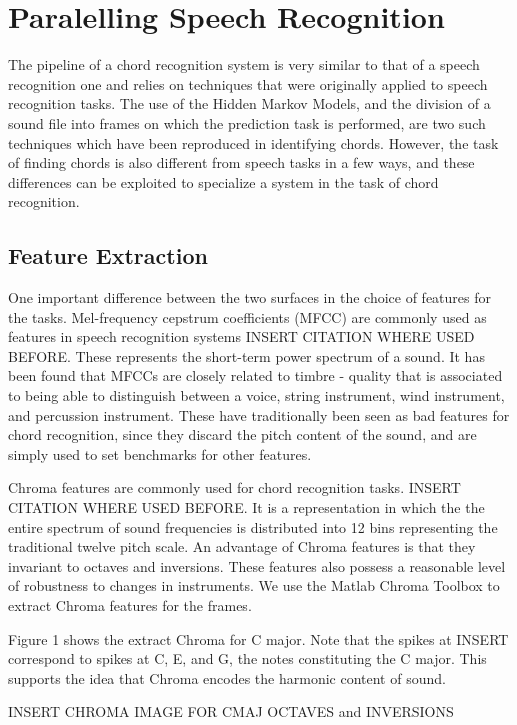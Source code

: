 \documentclass{article}
\begin{document}
\section{Paralelling Speech Recognition}

The pipeline of a chord recognition system is very similar to that of a speech recognition one and relies on techniques that were originally applied to speech recognition tasks. The use of the Hidden Markov Models, and the division of a sound file into frames on which the prediction task is performed, are two such techniques which have been reproduced in identifying chords. However, the task of finding chords is also different from speech tasks in a few ways, and these differences can be exploited to specialize a system in the task of chord recognition.

\subsection{Feature Extraction}

One important difference between the two surfaces in the choice of features for the tasks. Mel-frequency cepstrum coefficients (MFCC) are commonly used as features in speech recognition systems INSERT CITATION WHERE USED BEFORE. These represents the short-term power spectrum of a sound. It has been found that MFCCs are closely related to timbre - quality that is associated to being able to distinguish between a voice, string instrument, wind instrument, and percussion instrument. These have traditionally been seen as bad features for chord recognition, since they discard the pitch content of the sound, and are simply used to set benchmarks for other features.

Chroma features are commonly used for chord recognition tasks. INSERT CITATION WHERE USED BEFORE. It is a representation in which the the entire spectrum of sound frequencies is distributed into 12 bins representing the traditional twelve pitch scale. An advantage of Chroma features is that they invariant to octaves and inversions. These features also possess a reasonable level of robustness to changes in instruments. We use the Matlab Chroma Toolbox to extract Chroma features for the frames.

Figure 1 shows the extract Chroma for C major. Note that the spikes at INSERT correspond to spikes at C, E, and G, the notes constituting the C major. This supports the idea that Chroma encodes the harmonic content of sound.

INSERT CHROMA IMAGE FOR CMAJ OCTAVES and INVERSIONS
\end{document}
